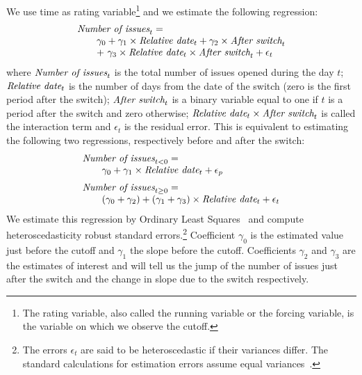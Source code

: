 \documentclass[conference]{IEEEtran}
\begin{document}
We use time as rating variable\footnote{The rating variable, also called the running variable or the forcing variable, is the variable on which we observe the cutoff.} and we estimate the following regression:  
\begin{equation*}
\arraycolsep=0pt
\begin{array}{l}
\mbox{\emph{Number of issues}}_t = \\
\quad\quad \gamma_0 +\gamma_1 \times \mbox{\emph{Relative date}}_t
+ \gamma_2 \times \mbox{\emph{After switch}}_t \\
\quad\quad +~\gamma_3 \times \mbox{\emph{Relative date}}_t \times \mbox{\emph{After switch}}_t
+ \epsilon_t
\end{array}
\end{equation*}
\noindent where $\mbox{\emph{Number of issues}}_t$ is the total number of issues opened during the day $t$; $\mbox{\emph{Relative date}}_t$ is the number of days from the date of the switch (zero is the first period after the switch); $\mbox{\emph{After switch}}_t$ is a binary variable equal to one if $t$ is a period after the switch and zero otherwise; $\mbox{\emph{Relative date}}_t \times \mbox{\emph{After switch}}_t$ is called the interaction term and $\epsilon_t$ is the residual error. This is equivalent to estimating the following two regressions, respectively before and after the switch:
\begin{equation*}
\begin{array}{l}
\mbox{\emph{Number of issues}}_{t < 0} =\\
\quad\quad \gamma_0 + \gamma_1 \times \mbox{\emph{Relative date}}_t + \epsilon_p \medskip\\
\mbox{\emph{Number of issues}}_{t \geq 0} = \\
\quad\quad (\gamma_0 + \gamma_2) + (\gamma_1 + \gamma_3) \times \mbox{\emph{Relative date}}_t + \epsilon_t
\end{array}
\end{equation*}
We estimate this regression by Ordinary Least Squares~\cite{wooldridge2015introductory} and compute heteroscedasticity robust standard errors.\footnote{The errors $\epsilon_t$ are said to be heteroscedastic if their variances differ. The standard calculations for estimation errors assume equal variances~\cite{wooldridge2015introductory}.
} Coefficient $\gamma_0$ is the estimated value just before the cutoff and $\gamma_1$ the slope before the cutoff. Coefficients $\gamma_2$ and $\gamma_3$ are the estimates of interest and will tell us the jump of the number of issues just after the switch and the change in slope due to the switch respectively. 
\end{document}
